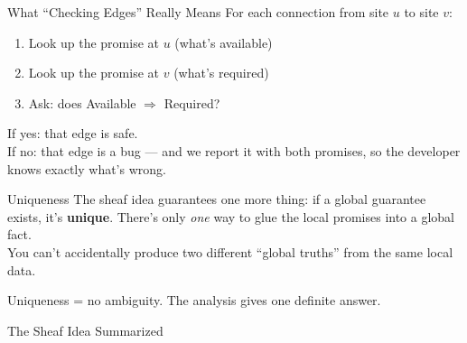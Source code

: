 \documentclass[aspectratio=169,10pt]{beamer}
\newcommand{\hint}[1]{\begin{center}
  \colorbox{hintbg}{\parbox{0.88\textwidth}{\centering\small #1}}\end{center}}
\begin{document}
\begin{frame}{What ``Checking Edges'' Really Means}
For each connection from site $u$ to site $v$:
\vspace{0.3em}
\begin{enumerate}
  \item Look up the promise at $u$ (what's available)
  \item Look up the promise at $v$ (what's required)
  \item Ask: does Available $\Rightarrow$ Required?
\end{enumerate}
\vspace{0.3em}
If yes: that edge is \textcolor{safe}{safe}.\\
If no: that edge is a \textcolor{danger}{bug} --- and we report it with both promises, so the developer knows exactly what's wrong.
\end{frame}

\begin{frame}{Uniqueness}
The sheaf idea guarantees one more thing: if a global guarantee exists, it's \textbf{unique}.
\vspace{0.5em}
There's only \emph{one} way to glue the local promises into a global fact.\\
You can't accidentally produce two different ``global truths'' from the same local data.
\vspace{0.5em}
\hint{Uniqueness = no ambiguity. The analysis gives one definite answer.}
\end{frame}

\begin{frame}{The Sheaf Idea Summarized}
\begin{center}
\end{center}
\end{frame}
\end{document}
